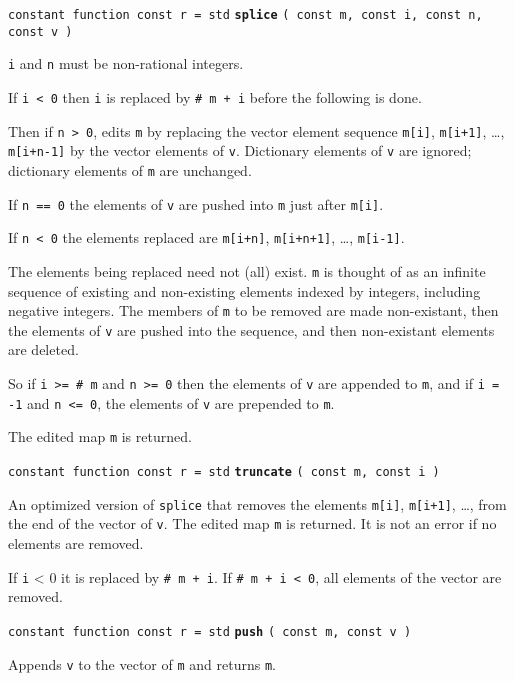 \documentclass[12pt]{article}
\newcommand{\ttkey}[1]{{\tt \bfseries #1}}
\newenvironment{indpar}[1][0.3in]%
	{\begin{list}{}%
		     {\setlength{\itemsep}{0in}%
		      \setlength{\topsep}{0in}%
		      \setlength{\parsep}{1ex}%
		      \setlength{\labelwidth}{#1}%
		      \setlength{\leftmargin}{#1}%
		      \addtolength{\leftmargin}{\labelsep}}%
	 \item}%
	{\end{list}}
\begin{document}
{\tt constant function const r = std} \ttkey{splice}
    {\tt ( const m, const i, const n, const v )}
\begin{indpar}
{\tt i} and {\tt n} must be non-rational integers.

If {\tt i < 0} then {\tt i} is replaced by {\tt \# m + i} before the
following is done.

Then if {\tt n > 0},
edits {\tt m} by replacing the vector element sequence
{\tt m[i]}, {\tt m[i+1]}, \ldots, {\tt m[i+n-1]} by the
vector elements of {\tt v}.  Dictionary elements of {\tt v} are ignored;
dictionary elements of {\tt m} are unchanged.

If {\tt n == 0}
the elements of {\tt v} are pushed into {\tt m}
just after {\tt m[i]}.

If {\tt n < 0} the elements replaced are
{\tt m[i+n]}, {\tt m[i+n+1]}, \ldots, {\tt m[i-1]}.

The elements being replaced need not (all) exist.  {\tt m} is thought
of as an infinite sequence of existing and non-existing elements indexed
by integers, including negative integers.  The members of
{\tt m} to be removed are made non-existant,
then the elements of {\tt v} are pushed
into the sequence, and then non-existant elements are deleted.

So if {\tt i >= \# m} and {\tt n >= 0} then the elements of {\tt v}
are appended to {\tt m}, and if {\tt i = -1} and {\tt n <= 0}, the
elements of {\tt v} are prepended to {\tt m}.

The edited map {\tt m} is returned.

\end{indpar}

{\tt constant function const r = std} \ttkey{truncate}
                                      {\tt ( const m, const i )}
\begin{indpar}
An optimized version of {\tt splice} that removes the elements
{\tt m[i]}, {\tt m[i+1]}, \ldots, from the end of the vector of {\tt v}.
The edited map {\tt m} is returned.  It is not an error if no elements
are removed.

If {\tt i} < 0 it is replaced by {\tt \# m + i}.  If {\tt \# m + i < 0},
all elements of the vector are removed.
\end{indpar}

{\tt constant function const r = std} \ttkey{push} {\tt ( const m, const v )}
\begin{indpar}
Appends {\tt v} to the vector of {\tt m} and returns {\tt m}.
\end{indpar}
\end{document}
